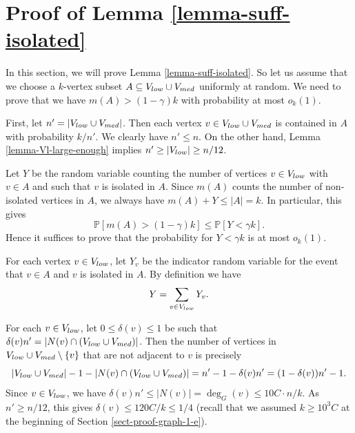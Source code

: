 \documentclass[11pt]{article}
\theoremstyle{definition}
\numberwithin{equation}{section}
\begin{document}
\section{Proof of Lemma \ref{lemma-suff-isolated}}\label{sect-suff-isolated}

In this section, we will prove Lemma \ref{lemma-suff-isolated}. So let us assume that we choose a $k$-vertex subset $A\subseteq V_{\textnormal{low}}\cup V_{\textnormal{med}}$ uniformly at random. We need to prove that we have $m(A)>(1-\gamma)k$ with probability at most $o_k(1)$. 

First, let $n'=\vert V_{\textnormal{low}}\cup V_{\textnormal{med}}\vert$. Then each vertex $v\in V_{\textnormal{low}}\cup V_{\textnormal{med}}$ is contained in $A$ with probability $k/n'$. We clearly have $n'\leq n$. On the other hand, Lemma \ref{lemma-Vl-large-enough} implies $n'\geq \vert V_{\textnormal{low}}\vert\geq n/12$.

Let $Y$ be the random variable counting the number of vertices $v\in V_{\textnormal{low}}$ with $v\in A$ and such that $v$ is isolated in $A$. Since $m(A)$ counts the number of non-isolated vertices in $A$, we always have $m(A)+Y\leq \vert A\vert = k$. In particular, this gives
\[\mathbb{P}[m(A)>(1-\gamma)k]\leq \mathbb{P}[Y<\gamma k].\]
Hence it suffices to prove that the probability for $Y<\gamma k$ is at most $o_k(1)$.

For each vertex $v\in V_{\textnormal{low}}$, let $Y_v$ be the indicator random variable for the event that $v\in A$ and $v$ is isolated in $A$. By definition we have
\[Y=\sum_{v\in V_{\textnormal{low}}}Y_v.\]

For each $v\in V_{\textnormal{low}}$, let $0\leq \delta(v)\leq 1$ be such that $\delta(v)n'=\vert N(v)\cap (V_{\textnormal{low}}\cup V_{\textnormal{med}})\vert$. Then the number of vertices in $V_{\textnormal{low}}\cup V_{\textnormal{med}}\setminus \lbrace v\rbrace$ that are not adjacent to $v$ is precisely
\[\vert V_{\textnormal{low}}\cup V_{\textnormal{med}}\vert-1-\vert N(v)\cap (V_{\textnormal{low}}\cup V_{\textnormal{med}})\vert=n'-1-\delta(v) n'=(1-\delta(v))n'-1.\]
Since $v\in V_{\textnormal{low}}$, we have $\delta(v)n'\leq \vert N(v)\vert=\deg_G(v)\leq 10C\cdot n/k$. As $n'\geq n/12$, this gives $\delta(v)\leq 120C/k\leq 1/4$ (recall that we assumed $k\geq 10^3C$ at the beginning of Section \ref{sect-proof-graph-1-e}).
\end{document}
